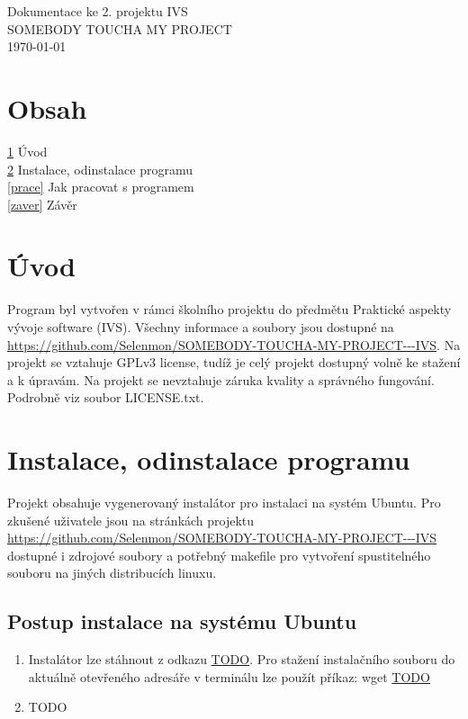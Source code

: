 \documentclass[a4paper, 11pt]{article}
\begin{document}
\begin{center}
\Large{Dokumentace ke 2. projektu IVS\\\medskip}
\normalsize
SOMEBODY TOUCHA MY PROJECT\\\medskip
\today\\\bigskip
\end{center}


\section*{Obsah}
\ref{uvod} \quad Úvod \hfill \pageref{uvod}\medskip \\
\ref{instalace} \quad Instalace, odinstalace programu \hfill \pageref{instalace}\medskip \\
\ref{prace} \quad Jak pracovat s programem \hfill \pageref{prace}\medskip \\
\ref{zaver} \quad Závěr \hfill \pageref{zaver}

\newpage


\section{Úvod}\label{uvod}
Program byl vytvořen v rámci školního projektu do předmětu Praktické aspekty vývoje software (IVS). Všechny informace a soubory jsou dostupné na \url{https://github.com/Selenmon/SOMEBODY-TOUCHA-MY-PROJECT---IVS}. Na projekt se vztahuje GPLv3 license, tudíž je celý projekt dostupný volně ke stažení a k úpravám. Na projekt se nevztahuje záruka kvality a správného fungování. Podrobně viz soubor LICENSE.txt.

\section{Instalace, odinstalace programu}\label{instalace}
Projekt obsahuje vygenerovaný instalátor pro instalaci na systém Ubuntu. Pro zkušené uživatele jsou na stránkách projektu \url{https://github.com/Selenmon/SOMEBODY-TOUCHA-MY-PROJECT---IVS} dostupné i zdrojové soubory a potřebný makefile pro vytvoření spustitelného souboru na jiných distribucích linuxu.

\subsection{Postup instalace na systému Ubuntu}
\begin{enumerate}
\item Instalátor lze stáhnout z odkazu \url{TODO}. Pro stažení instalačního souboru do aktuálně otevřeného adresáře v terminálu lze použít příkaz: wget \url{TODO}
\item TODO
\end{enumerate}
\end{document}
